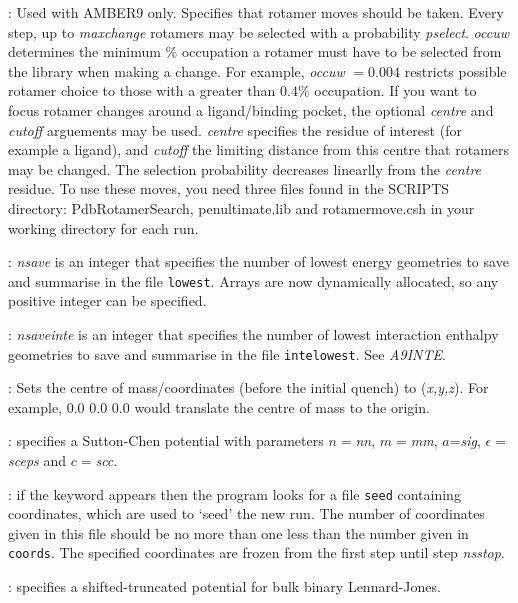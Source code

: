 : Used with AMBER9 only. Specifies that rotamer moves should be taken. Every step, up to {\it maxchange} rotamers may be selected with a probability {\it pselect}. {\it occuw} determines the minimum \% occupation a rotamer must have to be selected from the library\cite{lovelljm00} when making a change. For example, {\it occuw} $= 0.004$ restricts possible rotamer choice to those with a greater than 0.4\% occupation. If you want to focus rotamer changes around a ligand/binding pocket, the optional {\it centre} and {\it cutoff} arguements may be used. {\it centre} specifies the residue of interest (for example a ligand), and {\it cutoff} the limiting distance from this centre that rotamers may be changed. The selection probability decreases linearlly from the {\it centre} residue. To use these moves, you need three files found in the SCRIPTS directory: PdbRotamerSearch, penultimate.lib and rotamermove.csh in your working directory for each run. 

: {\it nsave\/} is an integer that specifies the number of lowest
energy geometries to save and summarise in the file {\tt lowest}. 
Arrays are now dynamically allocated, so any positive integer can be specified.

: {\it nsaveinte\/} is an integer that specifies the number of lowest
interaction enthalpy geometries to save and summarise in the file {\tt intelowest}. See {\it A9INTE\/}. 

: Sets the centre of mass/coordinates (before the initial quench) to ({\it x,y,z\/}). For example, { 0.0 0.0 0.0\/}
would translate the centre of mass to the origin.

: specifies a Sutton-Chen potential\cite{suttonc90} with
parameters $n=${\it nn\/}, $m=${\it mm\/}, $a$={\it sig\/}, $\epsilon=${\it sceps\/} and 
$c=${\it scc\/}.

: if the {\/} keyword appears then the program
looks for a file {\tt seed} containing coordinates, which are used to `seed' the new run.
The number of coordinates given in this file should be no more than one less than the number
given in {\tt coords}. The specified coordinates are frozen from the first step until 
step {\it nsstop\/}.

: specifies a shifted-truncated potential for bulk binary Lennard-Jones.

